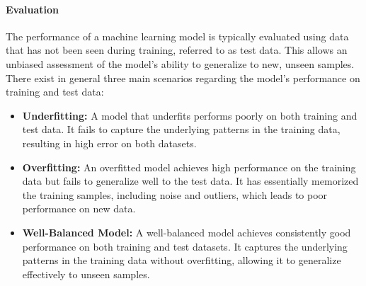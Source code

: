 \paragraph{Evaluation}
The performance of a machine learning model is typically evaluated using data that has not been seen during training, referred to as test data. This allows an unbiased assessment of the model's ability to generalize to new, unseen samples. There exist in general three main scenarios regarding the model's performance on training and test data:
\begin{itemize}
	\item \textbf{Underfitting:} A model that underfits performs poorly on both training and test data. It fails to capture the underlying patterns in the training data, resulting in high error on both datasets.
	\item \textbf{Overfitting:} An overfitted model achieves high performance on the training data but fails to generalize well to the test data. It has essentially memorized the training samples, including noise and outliers, which leads to poor performance on new data.
	\item \textbf{Well-Balanced Model:} A well-balanced model achieves consistently good performance on both training and test datasets. It captures the underlying patterns in the training data without overfitting, allowing it to generalize effectively to unseen samples. 
\end{itemize}












